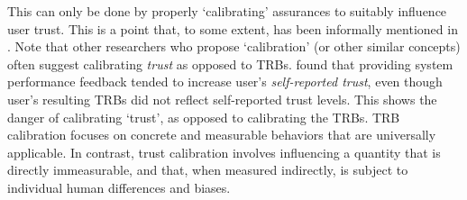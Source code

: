 This can only be done by properly `calibrating' assurances to suitably influence user trust. This is a point that, to some extent, has been informally mentioned in \cite{Muir1994-ow,Lillard2016-yg,Lee2004-pv,Hutchins2015-if}. 
%
Note that other researchers who propose `calibration' (or other similar concepts) often suggest calibrating \emph{trust} as opposed to TRBs. \citet{Dzindolet2003-ts} found that providing system performance feedback tended to increase user's \textit{self-reported trust}, even though user's resulting TRBs did not reflect self-reported trust levels. This shows the danger of calibrating `trust', as opposed to calibrating the TRBs. TRB calibration focuses on concrete and measurable behaviors that are universally applicable. In contrast, trust calibration involves influencing a quantity that is directly immeasurable, and that, when measured indirectly, is subject to individual human differences and biases. %

